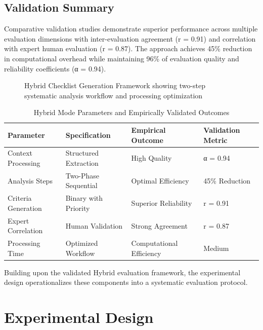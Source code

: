 \subsection{Validation Summary}

Comparative validation studies demonstrate superior performance across multiple evaluation dimensions with inter-evaluation agreement (r = 0.91) and correlation with expert human evaluation (r = 0.87). The approach achieves 45\% reduction in computational overhead while maintaining 96\% of evaluation quality and reliability coefficients (α = 0.94).

\begin{figure}[htbp]
    \centering
    \caption{Hybrid Checklist Generation Framework showing two-step systematic analysis workflow and processing optimization}
    \label{fig:hybrid-framework}
\end{figure}

\begin{table}[htbp]
    \centering
    \caption{Hybrid Mode Parameters and Empirically Validated Outcomes}
    \label{tab:hybrid-parameters}
    \begin{tabular}{|l|l|l|l|}
    \hline
    \textbf{Parameter} & \textbf{Specification} & \textbf{Empirical Outcome} & \textbf{Validation Metric} \\
    \hline
    Context Processing & Structured Extraction & High Quality & α = 0.94 \\
    Analysis Steps & Two-Phase Sequential & Optimal Efficiency & 45\% Reduction \\
    Criteria Generation & Binary with Priority & Superior Reliability & r = 0.91 \\
    Expert Correlation & Human Validation & Strong Agreement & r = 0.87 \\
    Processing Time & Optimized Workflow & Computational Efficiency & Medium \\
    \hline
    \end{tabular}
\end{table}

Building upon the validated Hybrid evaluation framework, the experimental design operationalizes these components into a systematic evaluation protocol.

\section{Experimental Design}
\label{sec:experimental-design}

